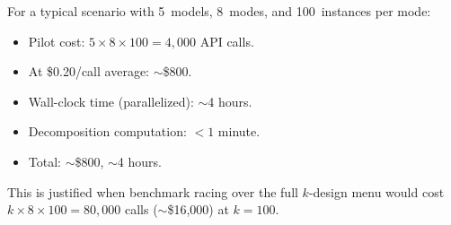 \documentclass[twoside,11pt]{article}
\begin{document}
For a typical scenario with 5~models, 8~modes, and 100~instances per mode:
\begin{itemize}[nosep]
  \item Pilot cost: $5 \times 8 \times 100 = 4{,}000$ API calls.
  \item At \$0.20/call average: $\sim$\$800.
  \item Wall-clock time (parallelized): $\sim$4 hours.
  \item Decomposition computation: $< 1$ minute.
  \item Total: $\sim$\$800, $\sim$4 hours.
\end{itemize}

This is justified when benchmark racing over the full $k$-design menu would cost $k \times 8 \times 100 = 80{,}000$ calls ($\sim$\$16{,}000) at $k = 100$.



\end{document}
